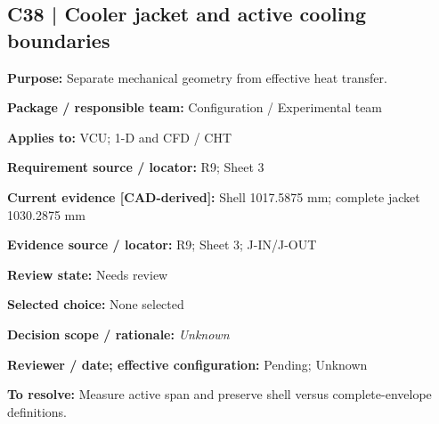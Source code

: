 \documentclass[11pt]{article}
\begin{document}
\par\noindent\begin{minipage}{\textwidth}\small\setlength{\parskip}{2pt}
\subsection*{C38 | Cooler jacket and active cooling boundaries}
\textbf{Purpose:} Separate mechanical geometry from effective heat transfer.\par
\textbf{Package / responsible team:} Configuration / Experimental team\par
\textbf{Applies to:} VCU; 1-D and CFD / CHT\par
\textbf{Requirement source / locator:} R9; Sheet 3\par
\textbf{Current evidence [CAD-derived]:} Shell 1017.5875 mm; complete jacket 1030.2875 mm\par
\textbf{Evidence source / locator:} R9; Sheet 3; J-IN/J-OUT\par
\textbf{Review state:} Needs review\par
\textbf{Selected choice:} None selected\par
\textbf{Decision scope / rationale:} \textit{Unknown}\par
\textbf{Reviewer / date; effective configuration:} Pending; Unknown\par
\textbf{To resolve:} Measure active span and preserve shell versus complete-envelope definitions.\par
\end{minipage}\par\vspace{5pt}
\end{document}
